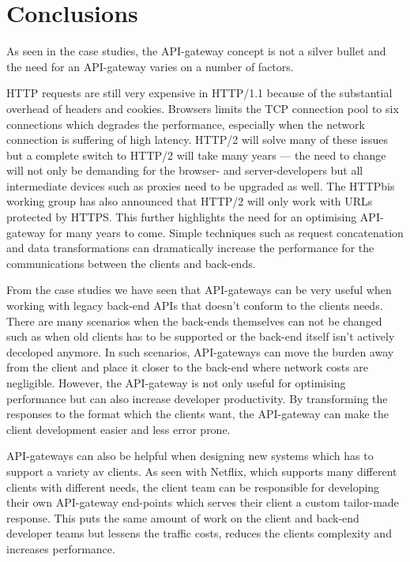 \documentclass{cslthse-msc}
\begin{document}
\chapter{Conclusions}
As seen in the case studies, the API-gateway concept is not a silver bullet and the need for an API-gateway varies on a number of factors.

HTTP requests are still very expensive in HTTP/1.1 because of the substantial overhead of headers and cookies. Browsers limits the TCP connection pool to six connections which degrades the performance, especially when the network connection is suffering of high latency. HTTP/2 will solve many of these issues but a complete switch to HTTP/2 will take many years --- the need to change will not only be demanding for the browser- and server-developers but all intermediate devices such as proxies need to be upgraded as well. The HTTPbis working group has also announced that HTTP/2 will only work with URLs protected by HTTPS\cite{http2_ssl}. This further highlights the need for an optimising API-gateway for many years to come. Simple techniques such as request concatenation and data transformations can dramatically increase the performance for the communications between the clients and back-ends.

From the case studies we have seen that API-gateways can be very useful when working with legacy back-end APIs that doesn't conform to the clients needs. There are many scenarios when the back-ends themselves can not be changed such as when old clients has to be supported or the back-end itself isn't actively deceloped anymore. In such scenarios, API-gateways can move the burden away from the client and place it closer to the back-end where network costs are negligible. However, the API-gateway is not only useful for optimising performance but can also increase developer productivity. By transforming the responses to the format which the clients want, the API-gateway can make the client development easier and less error prone.

API-gateways can also be helpful when designing new systems which has to support a variety av clients. As seen with Netflix\cite{netflix}, which supports many different clients with different needs, the client team can be responsible for developing their own API-gateway end-points which serves their client a custom tailor-made response. This puts the same amount of work on the client and back-end developer teams but lessens the traffic costs, reduces the clients complexity and increases performance.
\end{document}
